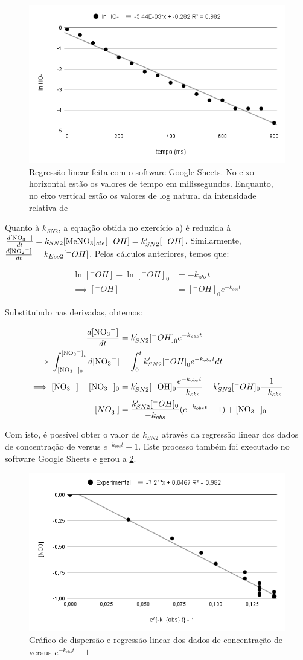 \begin{figure}[H]
    \centering
    \includegraphics[width=.5\linewidth]{fig/linReg_Q3b}
    \caption{Regressão linear feita com o software Google Sheets. No eixo horizontal estão os valores de tempo em milissegundos. Enquanto, no eixo vertical estão os valores de log natural da intensidade relativa de }\label{regressao}
\end{figure}

Quanto à \(k_{SN2}\), a equação obtida no exercício a) é reduzida à \(\frac{d \ce{[NO3^-]}}{dt} = k_{SN2} [\ce{MeNO3}]_{cte} [^-OH] = k'_{SN2} [^-OH]\). Similarmente, \(\frac{d[\ce{NO2^-}]}{dt} = k_{Eco2}[^-OH]\). Pelos cálculos anteriores, temos que:

\begin{align*}
    \ln [^-OH] - \ln [^-OH]_0 &= -k_{obs}t\\
    \implies [^-OH] &= [^-OH]_0 e^{-k_{obs}t}
\end{align*}

Substituindo \ce{[^-OH]} nas derivadas, obtemos:

\begin{align*}
    \frac{d \ce{[NO3^-]}}{dt} &= k'_{SN2} {[^-OH]}_0 e^{-k_{obs}t} \\
    \implies \int_{[\ce{NO3^-}]_0}^{\ce{[NO3^-]}_t} d \ce{[NO3^-]} &= \int_{0}^{t} k'_{SN2} {[^-OH]}_0 e^{-k_{obs}t} dt \\
    \implies [\ce{NO3^-}] - [\ce{NO3^-}]_0 &= k'_{SN2}[\ce{^-OH}]_0 \frac{e^{-k_{obs}t}}{-k_{obs}} - k'_{SN2} [^-OH]_0 \frac{1}{-k_{obs}} \\
    [NO_3^-] &= \frac{k'_{SN2}[^-OH]_0}{-k_{obs}}(e^{-k_{obs}t} - 1) + [\ce{NO3^-}]_0
\end{align*}

Com isto, é possível obter o valor de \(k_{SN2}\) através da regressão linear dos dados de concentração de  versus \(e^{-k_{obs} t} - 1\). Este processo também foi executado no software Google Sheets e gerou a \cref{reg_NO3}.

\begin{figure}[H]
    \centering
    \includegraphics[width=.5\linewidth]{fig/linReg_NO3}
    \caption{Gráfico de dispersão e regressão linear dos dados de concentração de  versus \(e^{-k_{obs} t} - 1\)}\label{reg_NO3}
\end{figure}

